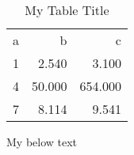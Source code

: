 \begin{table}
\centering
\begin{threeparttable}
\caption{My Table Title}
\begin{tabular}{ld{2.3}D{.}{,}{3.3}}
\toprule
a & b & c\\
1 &  2.540 &   3.100 \\
4 & 50.000 & 654.000 \\
7 &  8.114 &   9.541 \\
\bottomrule

\end{tabular}
\begin{tablenotes}
My below text
\end{tablenotes}
\end{threeparttable}
\end{table}